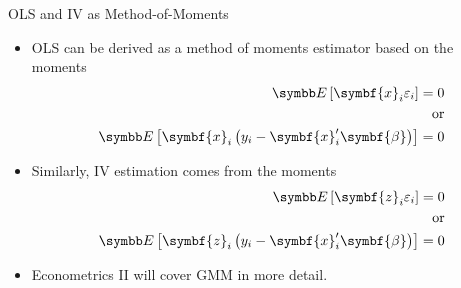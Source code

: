 \documentclass[aspectratio=169,11pt]{beamer}
\begin{document}
\begin{frame}{OLS and IV as Method-of-Moments}
\begin{itemize}
\item OLS can be derived as a method of moments estimator based on the moments
\begin{align*}
\E\left[\symbf{x}_{i}\varepsilon_{i}\right]=0\\
	\text{or}\\
\E\left[\symbf{x}_{i}\left(y_{i}-\symbf{x}_{i}'\symbf{\beta}\right)\right]=0
\end{align*}
\medskip
\item Similarly, IV estimation comes from the moments
\begin{align*}
\E\left[\symbf{z}_{i}\varepsilon_{i}\right]=0\\
	\text{or}\\
\E\left[\symbf{z}_{i}\left(y_{i}-\symbf{x}_{i}'\symbf{\beta}\right)\right]=0
\end{align*}
\item Econometrics II will cover GMM in more detail.
\end{itemize}

\end{frame}
\end{document}
